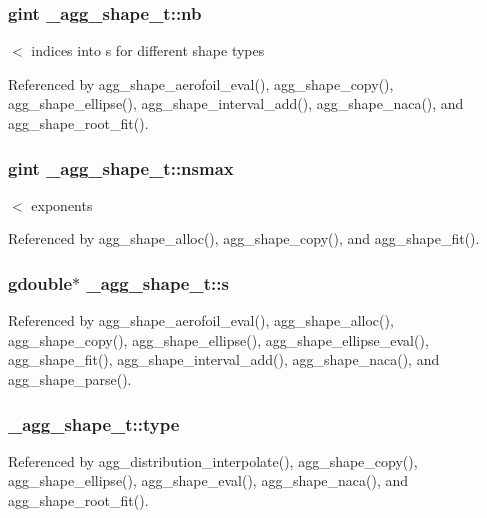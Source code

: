 \subsubsection[{nb}]{\setlength{\rightskip}{0pt plus 5cm}gint \+\_\+agg\+\_\+shape\+\_\+t\+::nb}\label{struct__agg__shape__t_a7dff950222bcc64aaea64548075e90d0}
$<$ indices into s for different shape types 

Referenced by agg\+\_\+shape\+\_\+aerofoil\+\_\+eval(), agg\+\_\+shape\+\_\+copy(), agg\+\_\+shape\+\_\+ellipse(), agg\+\_\+shape\+\_\+interval\+\_\+add(), agg\+\_\+shape\+\_\+naca(), and agg\+\_\+shape\+\_\+root\+\_\+fit().

\subsubsection[{nsmax}]{\setlength{\rightskip}{0pt plus 5cm}gint \+\_\+agg\+\_\+shape\+\_\+t\+::nsmax}\label{struct__agg__shape__t_aa3b18e638a127dfdee7f3e723b1404ea}
$<$ exponents 

Referenced by agg\+\_\+shape\+\_\+alloc(), agg\+\_\+shape\+\_\+copy(), and agg\+\_\+shape\+\_\+fit().

\subsubsection[{s}]{\setlength{\rightskip}{0pt plus 5cm}gdouble$\ast$ \+\_\+agg\+\_\+shape\+\_\+t\+::s}\label{struct__agg__shape__t_ae838fe855a3d9a2e6b08134e2173bc07}


Referenced by agg\+\_\+shape\+\_\+aerofoil\+\_\+eval(), agg\+\_\+shape\+\_\+alloc(), agg\+\_\+shape\+\_\+copy(), agg\+\_\+shape\+\_\+ellipse(), agg\+\_\+shape\+\_\+ellipse\+\_\+eval(), agg\+\_\+shape\+\_\+fit(), agg\+\_\+shape\+\_\+interval\+\_\+add(), agg\+\_\+shape\+\_\+naca(), and agg\+\_\+shape\+\_\+parse().

\subsubsection[{type}]{ \+\_\+agg\+\_\+shape\+\_\+t\+::type}\label{struct__agg__shape__t_aefc7563a059bd22483e5cb3ac314ad95}


Referenced by agg\+\_\+distribution\+\_\+interpolate(), agg\+\_\+shape\+\_\+copy(), agg\+\_\+shape\+\_\+ellipse(), agg\+\_\+shape\+\_\+eval(), agg\+\_\+shape\+\_\+naca(), and agg\+\_\+shape\+\_\+root\+\_\+fit().

